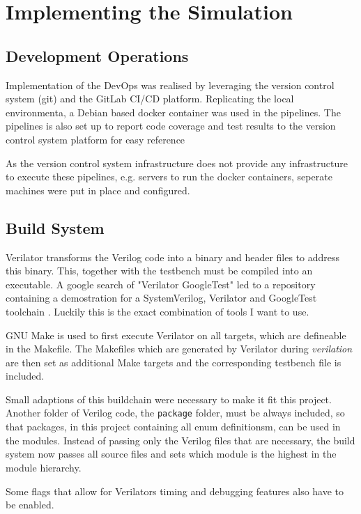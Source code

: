 \chapter{Implementing the Simulation}

\section{Development Operations }
Implementation of the DevOps was realised by leveraging the version control system (git) and the GitLab CI/CD platform. Replicating the local environmenta, a Debian based docker container \cite{dockerVerilator} was used in the pipelines. The pipelines is also set up to report code coverage and test results to the version control system platform for easy reference

As the version control system infrastructure does not provide any infrastructure to execute these pipelines, e.g. servers to run the docker containers, seperate machines were put in place and configured.



\section{Build System}
Verilator transforms the Verilog code into a binary and header files to address this binary. This, together with the testbench must be compiled into an executable. A google search of "Verilator GoogleTest" led to a repository containing a demostration for a SystemVerilog, Verilator and GoogleTest toolchain \cite{toolchain}. Luckily this is the exact combination of tools I want to use. 

GNU Make is used to first execute Verilator on all targets, which are defineable in the Makefile. The Makefiles which are generated by Verilator during \textit{verilation} are then set as additional Make targets and the corresponding testbench file is included.

Small adaptions of this buildchain were necessary to make it fit this project. Another folder of Verilog code, the \texttt{package} folder, must be always included, so that packages, in this project containing all enum definitionsm, can be used in the modules. Instead of passing only the Verilog files that are necessary, the build system now passes all source files and sets which module is the highest in the module hierarchy. 

Some flags that allow for Verilators timing and debugging features also have to be enabled.

